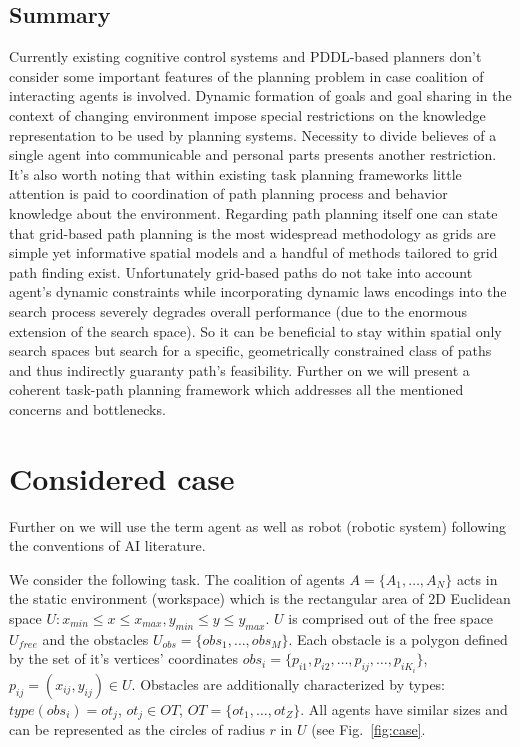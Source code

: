 \documentclass[runningheads,a4paper]{llncs}
\begin{document}
\subsection{Summary}
Currently existing cognitive control systems and PDDL-based planners don't consider some important features of the planning problem in case coalition of interacting agents is involved. Dynamic formation of goals and goal sharing in the context of changing environment impose special restrictions on the knowledge representation to be used by planning systems. Necessity to divide believes of a single agent into communicable and personal parts presents another restriction. It's also worth noting that within existing task planning frameworks little attention is paid to coordination of path planning process and behavior knowledge about the environment. Regarding path planning itself one can state that grid-based path planning is the most widespread methodology as grids are simple yet informative spatial models and a handful of methods tailored to grid path finding exist. Unfortunately grid-based paths do not take into account agent's dynamic constraints while incorporating dynamic laws encodings into the  search process severely degrades overall performance (due to the enormous extension of the search space). So it can be beneficial to stay within spatial only search spaces but search for a specific, geometrically constrained class of paths and thus indirectly guaranty path's feasibility. Further on we will present a coherent task-path planning framework which addresses all the mentioned concerns and bottlenecks.

\section{Considered case}\label{case}

Further on we will use the term agent as well as robot (robotic system) following the conventions of AI literature.

We consider the following task. The coalition of agents $A=\{A_1,\dots, A_N\}$ acts in the static  environment (workspace) which is the rectangular area of 2D Euclidean space $U: x_{min} \leq x \leq x_{max}, y_{min} \leq y \leq y_{max}$. $U$ is comprised out of the free space $U_{free}$ and the obstacles $U_{obs}=\{obs_1,\dots,obs_M\}$. Each obstacle is a polygon defined by the set of it's vertices' coordinates $obs_i=\{p_{i1}, p_{i2}, \dots, p_{ij}, \dots, p_{iK_i}\}$, $p_{ij}=(x_{ij}, y_{ij})\in U$. Obstacles are additionally characterized by types: $type(obs_i)=ot_j$, $ot_j\in OT$, $OT=\{ot_1, \dots, ot_Z\}$. All agents have similar sizes and can be represented as the circles of radius $r$ in $U$ (see Fig.~\ref{fig:case}.
\end{document}
